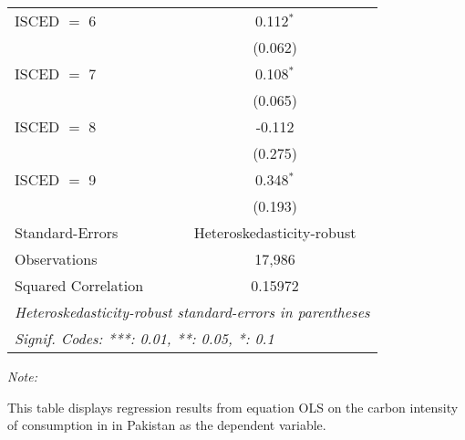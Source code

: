 \begin{table}[htbp!]
\begin{adjustbox}{width = 1\textwidth, max height = 0.95\textheight, center}
\begin{threeparttable}[b]
\begin{tabular}{lc}
            ISCED $=$ 6         & 0.112$^{*}$\\   
                                & (0.062)\\   
            ISCED $=$ 7         & 0.108$^{*}$\\   
                                & (0.065)\\   
            ISCED $=$ 8         & -0.112\\   
                                & (0.275)\\   
            ISCED $=$ 9         & 0.348$^{*}$\\   
                                & (0.193)\\   
            \midrule 
            Standard-Errors     & Heteroskedasticity-robust \\   
            Observations        & 17,986\\  
            Squared Correlation & 0.15972\\  
            \midrule \midrule
            \multicolumn{2}{l}{\emph{Heteroskedasticity-robust standard-errors in parentheses}}\\
            \multicolumn{2}{l}{\emph{Signif. Codes: ***: 0.01, **: 0.05, *: 0.1}}\\
         \end{tabular}
         
         \begin{tablenotes}\item \medskip \textit{Note:}
            \item This table displays regression results from equation OLS on the carbon intensity of consumption in  in Pakistan as the dependent variable. 
         \end{tablenotes}
      \end{threeparttable}
   \end{adjustbox}
\end{table}


